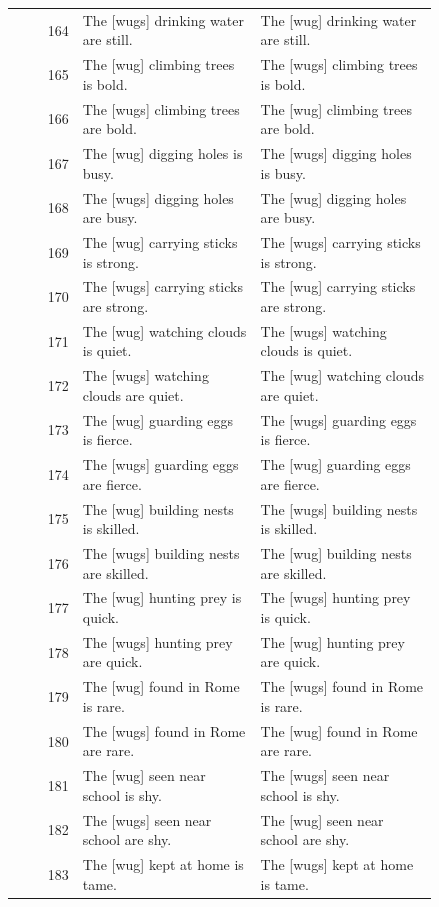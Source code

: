 \begin{table}[p]
\begin{tabular}{@{}rp{0.42\linewidth}p{0.42\linewidth}@{}}
164 & The {[}wugs{]} drinking water are still. & The {[}wug{]} drinking water are still. \\
165 & The {[}wug{]} climbing trees is bold. & The {[}wugs{]} climbing trees is bold. \\
166 & The {[}wugs{]} climbing trees are bold. & The {[}wug{]} climbing trees are bold. \\
167 & The {[}wug{]} digging holes is busy. & The {[}wugs{]} digging holes is busy. \\
168 & The {[}wugs{]} digging holes are busy. & The {[}wug{]} digging holes are busy. \\
169 & The {[}wug{]} carrying sticks is strong. & The {[}wugs{]} carrying sticks is strong. \\
170 & The {[}wugs{]} carrying sticks are strong. & The {[}wug{]} carrying sticks are strong. \\
171 & The {[}wug{]} watching clouds is quiet. & The {[}wugs{]} watching clouds is quiet. \\
172 & The {[}wugs{]} watching clouds are quiet. & The {[}wug{]} watching clouds are quiet. \\
173 & The {[}wug{]} guarding eggs is fierce. & The {[}wugs{]} guarding eggs is fierce. \\
174 & The {[}wugs{]} guarding eggs are fierce. & The {[}wug{]} guarding eggs are fierce. \\
175 & The {[}wug{]} building nests is skilled. & The {[}wugs{]} building nests is skilled. \\
176 & The {[}wugs{]} building nests are skilled. & The {[}wug{]} building nests are skilled. \\
177 & The {[}wug{]} hunting prey is quick. & The {[}wugs{]} hunting prey is quick. \\
178 & The {[}wugs{]} hunting prey are quick. & The {[}wug{]} hunting prey are quick. \\
179 & The {[}wug{]} found in Rome is rare. & The {[}wugs{]} found in Rome is rare. \\
180 & The {[}wugs{]} found in Rome are rare. & The {[}wug{]} found in Rome are rare. \\
181 & The {[}wug{]} seen near school is shy. & The {[}wugs{]} seen near school is shy. \\
182 & The {[}wugs{]} seen near school are shy. & The {[}wug{]} seen near school are shy. \\
183 & The {[}wug{]} kept at home is tame. & The {[}wugs{]} kept at home is tame. \\

\end{tabular}
\end{table}
